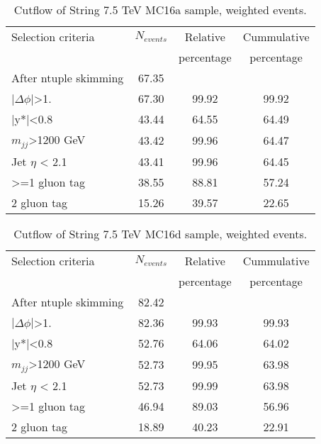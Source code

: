 \begin{table}[ht]
\begin{center}
\begin{tabular}{|l|c|c|c|}
\hline
Selection criteria & $N_{events}$ & Relative & Cummulative \\
 & & percentage & percentage \\
\hline
After ntuple skimming & 67.35 &  &  \\
$|\Delta\phi|$>1. & 67.30 & 99.92 & 99.92 \\
|y*|<0.8 & 43.44 & 64.55 & 64.49 \\
$m_{jj}$>1200 GeV & 43.42 & 99.96 & 64.47 \\
Jet $\eta$ < 2.1 & 43.41 & 99.96 & 64.45 \\
>=1 gluon tag & 38.55 & 88.81 & 57.24 \\
2 gluon tag & 15.26 & 39.57 & 22.65 \\
\hline
\end{tabular}
\end{center}
\caption{Cutflow of String 7.5 TeV MC16a sample, weighted events.}
\end{table}

\begin{table}[ht]
\begin{center}
\begin{tabular}{|l|c|c|c|}
\hline
Selection criteria & $N_{events}$ & Relative & Cummulative \\
 & & percentage & percentage \\
\hline
After ntuple skimming & 82.42 &  &  \\
$|\Delta\phi|$>1. & 82.36 & 99.93 & 99.93 \\
|y*|<0.8 & 52.76 & 64.06 & 64.02 \\
$m_{jj}$>1200 GeV & 52.73 & 99.95 & 63.98 \\
Jet $\eta$ < 2.1 & 52.73 & 99.99 & 63.98 \\
>=1 gluon tag & 46.94 & 89.03 & 56.96 \\
2 gluon tag & 18.89 & 40.23 & 22.91 \\
\hline
\end{tabular}
\end{center}
\caption{Cutflow of String 7.5 TeV MC16d sample, weighted events.}
\end{table}

